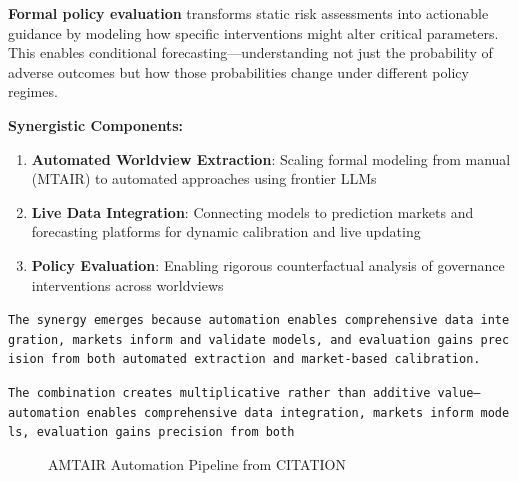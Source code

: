 \documentclass[
  11pt,
  letterpaper,
]{book}
\providecommand{\tightlist}{%
  \setlength{\itemsep}{0pt}\setlength{\parskip}{0pt}}
\begin{document}
\textbf{Formal policy evaluation} transforms static risk assessments
into actionable guidance by modeling how specific interventions might
alter critical parameters. This enables conditional
forecasting---understanding not just the probability of adverse outcomes
but how those probabilities change under different policy regimes.

\textbf{Synergistic Components:}

\begin{enumerate}
\def\labelenumi{\arabic{enumi}.}
\tightlist
\item
  \textbf{Automated Worldview Extraction}: Scaling formal modeling from
  manual (MTAIR) to automated approaches using frontier LLMs
\item
  \textbf{Live Data Integration}: Connecting models to prediction
  markets and forecasting platforms for dynamic calibration and live
  updating
\item
  \textbf{Policy Evaluation}: Enabling rigorous counterfactual analysis
  of governance interventions across worldviews
\end{enumerate}

\texttt{The\ synergy\ emerges\ because\ automation\ enables\ comprehensive\ data\ integration,\ markets\ inform\ and\ validate\ models,\ and\ evaluation\ gains\ precision\ from\ both\ automated\ extraction\ and\ market-based\ calibration.}

\texttt{The\ combination\ creates\ multiplicative\ rather\ than\ additive\ value—automation\ enables\ comprehensive\ data\ integration,\ markets\ inform\ models,\ evaluation\ gains\ precision\ from\ both}

\begin{figure}


\caption[Five-step AMTAIR automation pipeline from PDFs to Bayesian
networks]{\label{fig-automation_pipeline}AMTAIR Automation Pipeline from
CITATION}

\end{figure}%
\end{document}
